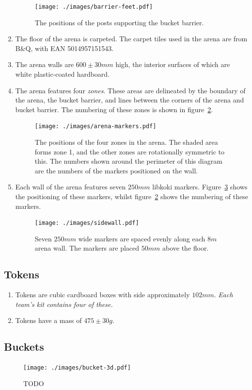\begin{enumerate}
  \begin{figure}
    \centering
    \texttt{[image: ./images/barrier-feet.pdf]}
    \caption{The positions of the posts supporting the bucket barrier.}
    \label{fig:bucket-barrier-legs}
  \end{figure}

\item The floor of the arena is carpeted.  The carpet tiles used in the arena are from B\&Q, with EAN 5014957151543.

\item The arena walls are $600\pm30mm$ high, the interior surfaces of which are white plastic-coated hardboard.

\item The arena features four \textit{zones}.  These areas are delineated by the boundary of the arena, the bucket barrier, and lines between the corners of the arena and bucket barrier.  The numbering of these zones is shown in figure~\ref{fig:arena-zones}.

  \begin{figure}
    \centering
    \texttt{[image: ./images/arena-markers.pdf]}
    \caption{The positions of the four zones in the arena.  The shaded area forms zone 1, and the other zones are rotationally symmetric to this.  The numbers shown around the perimeter of this diagram are the numbers of the markers positioned on the wall.}
    \label{fig:arena-zones}
  \end{figure}

\item Each wall of the arena features seven $250mm$ libkoki markers.  Figure~\ref{fig:arena-wall} shows the positioning of these markers, whilst figure~\ref{fig:arena-zones} shows the numbering of these markers.

  \begin{figure}
    \centering
    \texttt{[image: ./images/sidewall.pdf]}
    \caption{Seven $250mm$ wide markers are spaced evenly along each $8m$ arena wall.  The markers are placed $50mm$ above the floor.}
    \label{fig:arena-wall}
  \end{figure}

\end{enumerate}

\subsection{Tokens}
\label{sub:Tokens}
\begin {enumerate}
\item Tokens are cubic cardboard boxes with side approximately $102mm$.
\emph{Each team's kit contains four of these.}
\item Tokens have a mass of $475\pm30g$.
\end {enumerate}

\subsection{Buckets}
\label{sub:buckets}
\begin{figure}
  \centering
  \texttt{[image: ./images/bucket-3d.pdf]}
  \caption{TODO}
  \label{fig:bucket-3d}
\end{figure}


\clearpage
